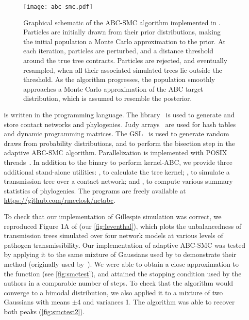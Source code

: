 \begin{figure}
    \texttt{[image: abc-smc.pdf]}
    \caption[Graphical schematic of the ABC-SMC algorithm implemented in .]{
      Graphical schematic of the \gls{ABC}-\gls{SMC} algorithm implemented in
      . Particles are initially drawn from their prior
      distributions, making the initial population a Monte Carlo approximation
      to the prior. At each iteration, particles are perturbed, and a distance
      threshold around the true tree contracts. Particles are rejected, and
      eventually resampled, when all their associated simulated trees lie
      outside the threshold. As the algorithm progresses, the population
      smoothly approaches a Monte Carlo approximation of the \gls{ABC} target
      distribution, which is assumed to resemble the posterior.
    }
    \label{fig:abcsmc}
\end{figure}

 is written in the  programming language. The
 library~\autocite{csardi2006igraph} is used to generate and
store contact networks and phylogenies. Judy arrays~\autocite{baskins2004judy}
are used for hash tables and dynamic programming matrices. The
\gls{GSL}~\autocite{gough2009gnu} is used to generate random draws from
probability distributions, and to perform the bisection step in the adaptive
\gls{ABC}-\gls{SMC} algorithm. Parallelization is implemented with POSIX
threads~\autocite{barney2009posix}. In addition to the  binary
to perform kernel-\gls{ABC}, we provide three additional stand-alone utilities:
, to calculate the tree kernel; , to
simulate a transmission tree over a contact network; and ,
to compute various summary statistics of phylogenies. The programs are freely
available at \url{https://github.com/rmcclosk/netabc}.

To check that our implementation of Gillespie simulation was correct, we
reproduced Figure 1A of \textcite{leventhal2012inferring} (our
\cref{fig:leventhal}), which plots the unbalancedness of transmission trees
simulated over four network models at various levels of pathogen
transmissibility. Our implementation of adaptive ABC-SMC was tested by applying
it to the same mixture of Gaussians used by \citeauthor{del2012adaptive} to
demonstrate their method (originally used by~\textcite{sisson2007sequential}).
We were able to obtain a close approximation to the function (see
\cref{fig:smctest}), and attained the stopping condition used by the authors in
a comparable number of steps. To check that the algorithm would converge to a
bimodal distribution, we also applied it to a mixture of two Gaussians with
means $\pm$4 and variances 1. The algorithm was able to recover both peaks
(\cref{fig:smctest2}).

